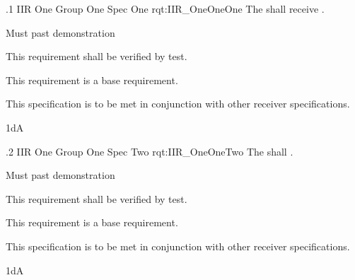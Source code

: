 \ONERQMTV
{\RqtNumberBase.1}
{IIR One Group One Spec One}
{rqt:IIR_OneOneOne}
{The \ThisSys{} shall receive \TBD.}
{
	\item [Phase 1] Must past demonstration
}
{This requirement shall be verified by test.}
{
	\item [N/A] This requirement is a base requirement.
}
{
	\item This specification is to be met in conjunction with other receiver specifications.
}
{1dA}

\ONERQMTV
{\RqtNumberBase.2}
{IIR One Group One Spec Two}
{rqt:IIR_OneOneTwo}
{The \ThisSys{} shall \TBD.}
{
	\item [Phase 1] Must past demonstration
}
{This requirement shall be verified by test.}
{
	\item [N/A] This requirement is a base requirement.
}
{
	\item This specification is to be met in conjunction with other receiver specifications.
}
{1dA}
